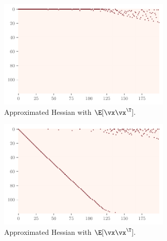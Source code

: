 \begin{figure}[H]
\begin{subfigure}[t]{0.065\textwidth}
    \end{subfigure}
    \bigskip
\begin{subfigure}[t]{0.46\textwidth}
        \centering
        \captionsetup{justification=centering}
        \includegraphics[width=0.9\textwidth]{Figures/Correspondence/LeNet5_fixlr0.01/xxT_Approxest_real_corr_expand_t200_CIFAR10_Exp1_LeNet5_fixlr0.01R2_E-1_fc1.pdf}
        \caption{Approximated Hessian with $\E[\vx\vx^\T].$}
        \label{fig:Corr_xxT_Approx_fc}
    \end{subfigure}%
    \begin{subfigure}[t]{0.46\textwidth}
        \centering
        \captionsetup{justification=centering}
        \includegraphics[width=0.9\textwidth]{Figures/Correspondence/LeNet5_fixlr0.01/UTAU_Approxest_real_corr_expand_t200_CIFAR10_Exp1_LeNet5_fixlr0.01R2_E-1_fc1.pdf}
        \caption{Approximated Hessian with $\E[\vx\vx^\T].$}
        \label{fig:Corr_UTAU_Approx_fc}
    \end{subfigure}%
    \begin{subfigure}[t]{0.065\textwidth}
        \centering

\end{subfigure}
\end{figure}
